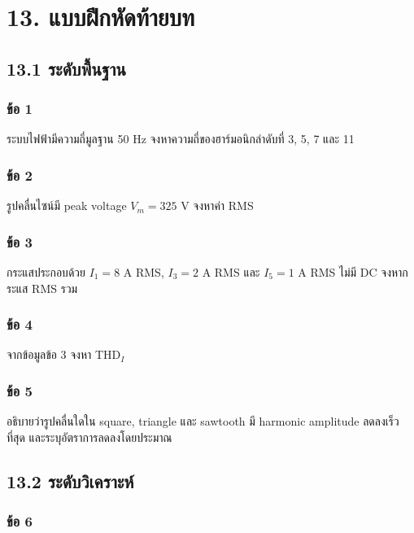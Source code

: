 \newpage

\section{13. แบบฝึกหัดท้ายบท}

\subsection{13.1 ระดับพื้นฐาน}

\subsubsection{ข้อ 1}

ระบบไฟฟ้ามีความถี่มูลฐาน 50 Hz จงหาความถี่ของฮาร์มอนิกลำดับที่ 3, 5, 7 และ 11

\subsubsection{ข้อ 2}

รูปคลื่นไซน์มี peak voltage $V_m=325$ V จงหาค่า RMS

\subsubsection{ข้อ 3}

กระแสประกอบด้วย $I_1=8$ A RMS, $I_3=2$ A RMS และ $I_5=1$ A RMS ไม่มี DC จงหากระแส RMS รวม

\subsubsection{ข้อ 4}

จากข้อมูลข้อ 3 จงหา THD$_I$

\subsubsection{ข้อ 5}

อธิบายว่ารูปคลื่นใดใน square, triangle และ sawtooth มี harmonic amplitude ลดลงเร็วที่สุด และระบุอัตราการลดลงโดยประมาณ



\subsection{13.2 ระดับวิเคราะห์}

\subsubsection{ข้อ 6}

